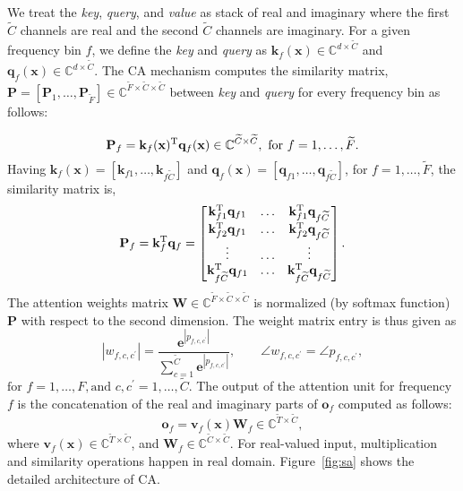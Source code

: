 \documentclass{article}
\newcommand{\smlv}{\mathbf{v}}
\newcommand{\x}{\mathbf{x}}
\newcommand{\e}{\mathbf{e}}
\newcommand{\kk}{\mathbf{k}}
\newcommand{\q}{\mathbf{q}}
\newcommand{\Bigp}{\mathbf{P}}
\newcommand{\ww}{\mathbf{W}}
\begin{document}
We treat the {\it key}, {\it query}, and {\it value} as stack of real and imaginary where the first $\widetilde{C}$ channels are real and the second $\widetilde{C}$ channels are imaginary. For a given frequency bin $f$, we define the {\it key} and {\it query} as $\kk_f(\x) \in \mathbb{C}^{d \times \widetilde{C}}$ and $\q_f(\x) \in \mathbb{C}^{d \times \widetilde{C}}$. The CA mechanism computes the similarity matrix, $\Bigp = [\Bigp_1, \ldots, \Bigp_{\widetilde{F}}] \in \mathbb{C} ^{\widetilde{F} \times \widetilde{C} \times\widetilde{C}}$ between {\it key} and {\it query} for every frequency bin as follows:

\begin{equation}\label{eq:fg}
\Bigp_f = \kk_f(\x)^{\text{T}} \q_f(\x) \in \mathbb{C}^{\widetilde{C} \times \widetilde{C}},\ \textrm{for } f = 1,\ldots, \widetilde{F}.\\
\end{equation}
Having $\kk_f(\x) = [\kk_{f1},\ldots, \kk_{f\widetilde{C}}] $ and $\q_f(\x) = [\q_{f1},\ldots, \q_{f\widetilde{C}}] $,  for $f = 1,\ldots, \widetilde{F}$, the similarity matrix is,
\begin{equation}\label{eq:corr}
\Bigp_f = \kk_f^{\text{T}} \q_f =
  \begin{bmatrix}
    \kk_{f1}^{\text{T}} \q_{f1} & \ldots & \kk_{f1}^{\text{T}} \q_{f\widetilde{C}} \\
    \kk_{f2}^{\text{T}} \q_{f1} & \ldots & \kk_{f2}^{\text{T}} \q_{f\widetilde{C}} \\
     \vdots & \ldots &  \vdots \\
     \kk_{f\widetilde{C}}^{\text{T}} \q_{f1} & \ldots & \kk_{f\widetilde{C}}^{\text{T}} \q_{f\widetilde{C}} \\
  \end{bmatrix}.\\
\end{equation}
The attention weights matrix $\ww \in \mathbb{C}^{\widetilde{F} \times \widetilde{C} \times \widetilde{C}}$ is normalized (by softmax function) $\Bigp$ with respect to the second dimension. The weight matrix entry is thus given as 
\begin{equation}\label{eq:attention}
|w_{f,c,c^\prime}| = \frac{\e^{|p_{f,c,c^\prime}|}}{\sum_{c=1}^{\widetilde{C}} \e^{|p_{f,c,c^\prime}|}},\qquad
\angle w_{f,c,c^\prime} =  \angle p_{f,c,c^\prime},
\end{equation}
$\textrm{for } f = 1,\ldots, F, \textrm{and } c,c^{\prime} = 1,\ldots, \widetilde{C}$. The output of the attention unit for frequency $f$ is the concatenation of the real and imaginary parts of $\textbf{o}_f$ computed as follows:
\begin{equation}\label{eq:out_sa} 
\textbf{o}_f = \smlv_f(\x) \ww_f \in \mathbb{C}^{\widetilde{T} \times \widetilde{C}},
\end{equation}
where $\smlv_f(\x) \in  \mathbb{C}^{\widetilde{T} \times \widetilde{C}}$, and $\ww_f \in \mathbb{C}^{\widetilde{C} \times \widetilde{C}}$. For real-valued input, multiplication and similarity operations happen in real domain. Figure~\ref{fig:sa} shows the detailed architecture of CA. 
\end{document}
